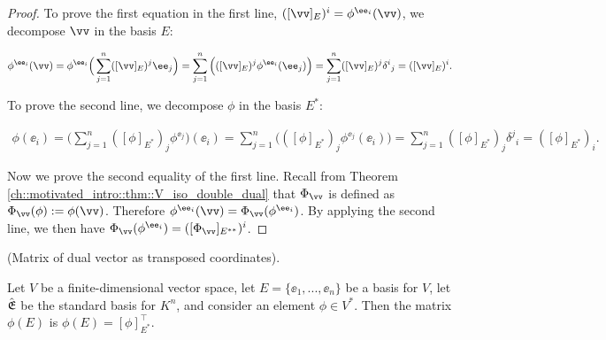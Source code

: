 \begin{proof}
    To prove the first equation in the first line, $([\vv]_E)^i = \phi^{\ee_i}(\vv)$, we decompose $\vv$ in the basis $E$:
    
    \begin{align*}
        \phi^{\ee_i}(\vv) = \phi^{\ee_i}\Big( \sum_{j = 1}^n ([\vv]_E)^j \ee_j \Big) = \sum_{j = 1}^n \Big( ([\vv]_E)^j \phi^{\ee_i}(\ee_j) \Big) = \sum_{j = 1}^n ([\vv]_E)^j \delta^i{}_j = ([\vv]_E)^i.
    \end{align*}
    
    To prove the second line, we decompose $\phi$ in the basis $E^*$:
    
    \begin{align*}
        \phi(\ee_i) = \Big( \sum_{j = 1}^n ([\phi]_{E^*})_j \phi^{\ee_j} \Big)(\ee_i) = \sum_{j = 1}^n \Big( ([\phi]_{E^*})_j \phi^{\ee_j}(\ee_i)\Big) = \sum_{j = 1}^n ([\phi]_{E^*})_j \delta^j{}_i = ([\phi]_{E^*})_i.
    \end{align*}
    
    Now we prove the second equality of the first line. Recall from Theorem \ref{ch::motivated_intro::thm::V_iso_double_dual} that $\Phi_\vv$ is defined as $\Phi_\vv(\phi) := \phi(\vv)$. Therefore $\phi^{\ee_i}(\vv) = \Phi_\vv(\phi^{\ee_i})$. By applying the second line, we then have $\Phi_\vv(\phi^{\ee_i}) = ([\Phi_\vv]_{E^{**}})^i$.
\end{proof}

\begin{theorem}
    \label{ch::intro_to_tensors::thm::matrix_of_dual_vector_as_trtransposed_coords}
    
    (Matrix of dual vector as transposed coordinates).
    
    Let $V$ be a finite-dimensional vector space, let $E = \{\ee_1, ..., \ee_n\}$ be a basis for $V$, let ${\hat{\mathfrak{E}}}$ be the standard basis for $K^n$, and consider an element $\phi \in V^*$. Then the matrix $\phi(E)$ is $\phi(E) = [\phi]_{E^*}^\top$.
\end{theorem}

